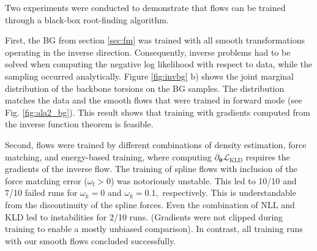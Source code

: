 \documentclass{article}
\begin{document}

Two experiments were conducted to demonstrate that flows can be trained through a black-box root-finding algorithm.

First, the BG from section \ref{sec:fm} was trained with all smooth transformations operating in the inverse direction. Consequently, inverse problems had to be solved when computing the negative log likelihood with respect to data, while the sampling occurred analytically. Figure \ref{fig:invbg} b) shows the joint marginal distribution of the backbone torsions on the BG samples. The distribution matches the data and the smooth flows that were trained in forward mode (see Fig. \ref{fig:ala2_bg}). This result shows that training with gradients computed from the inverse function theorem is feasible.

Second, flows were trained by different combinations of density estimation, force matching, and energy-based training, where computing $\partial_{\bm{\theta}}\mathcal{L}_{\mathrm{KLD}}$ requires the gradients of the inverse flow.
The training of spline flows with inclusion of the force matching error ($\omega_{\mathrm{f}}>0$) was notoriously unstable. This led to 10/10 and 7/10 failed runs for $\omega_{k}=0$ and $\omega_{k}=0.1,$ respectively. This is understandable from the discontinuity of the spline forces. Even the combination of NLL and KLD led to instabilities for 2/10 runs. (Gradients were not clipped during training to enable a mostly unbiased comparison). In contrast, all training runs with our smooth flows concluded successfully. 
 
\end{document}
